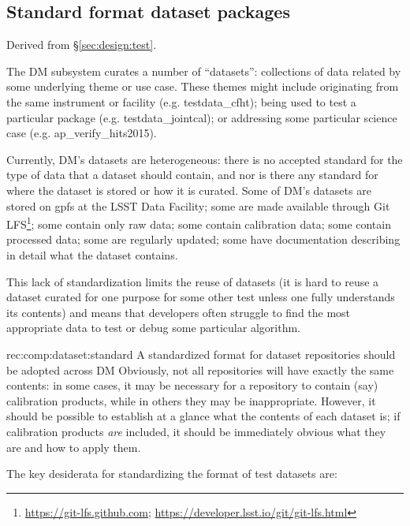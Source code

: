 \subsection{Standard format dataset packages}
\label{sec:comp:dataset}

Derived from \S\ref{sec:design:test}.

The DM subsystem curates a number of ``datasets'': collections of data related by some underlying theme or use case.
These themes might include originating from the same instrument or facility (e.g. testdata\_cfht); being used to test a particular package (e.g. testdata\_jointcal); or addressing some particular science case (e.g. ap\_verify\_hits2015).

Currently, DM's datasets are heterogeneous: there is no accepted standard for the type of data that a dataset should contain, and nor is there any standard for where the dataset is stored or how it is curated.
Some of DM's datasets are stored on \gls{gpfs} at the LSST Data Facility; some are made available through Git LFS\footnote{\url{https://git-lfs.github.com}; \url{https://developer.lsst.io/git/git-lfs.html}}; some contain only raw data; some contain calibration data; some contain processed data; some are regularly updated; some have documentation describing in detail what the dataset contains.

This lack of standardization limits the reuse of datasets (it is hard to reuse a dataset curated for one purpose for some other test unless one fully understands its contents) and means that developers often struggle to find the most appropriate data to test or debug some particular algorithm.

\begin{recommendation}
    {rec:comp:dataset:standard}
    {A standardized format for dataset repositories should be adopted across DM}
Obviously, not all repositories will have exactly the same contents: in some cases, it may be necessary for a repository to contain (say) calibration products, while in others they may be inappropriate.
However, it should be possible to establish at a glance what the contents of each dataset is; if calibration products \emph{are} included, it should be immediately obvious what they are and how to apply them.
\end{recommendation}

The key desiderata for standardizing the format of test datasets are:

